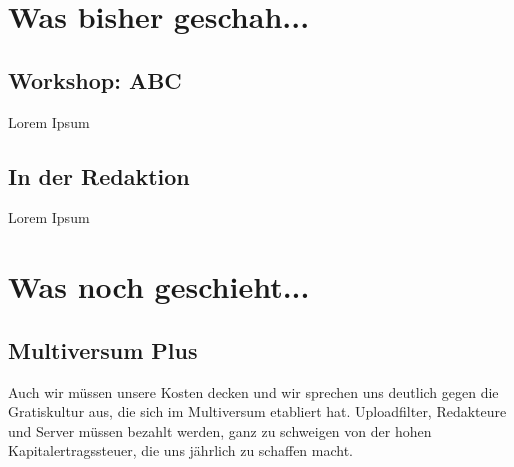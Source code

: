 
%



%


\multiauthor{}

\multidate{}

\multiausgabe{}

\multilosung{}



%



\makemultititle
%

\section{Was bisher geschah...}

\subsection{Workshop: ABC}
Lorem Ipsum

\subsection{In der Redaktion}
Lorem Ipsum

\section{Was noch geschieht...}

\subsection{Multiversum Plus}
Auch wir müssen unsere Kosten decken und wir sprechen uns deutlich gegen die Gratiskultur aus, die sich im Multiversum etabliert hat. Uploadfilter, Redakteure und Server müssen bezahlt werden, ganz zu schweigen von der hohen Kapitalertragssteuer, die uns jährlich zu schaffen macht.

